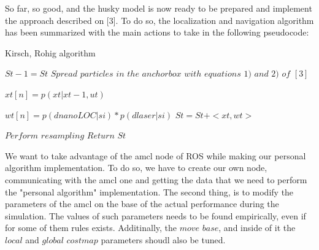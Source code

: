 \documentclass[11pt,a4paper]{article}
\begin{document}
So far, so good, and the husky model is now ready to be prepared and implement the approach described on [3]. To do so, the localization and navigation algorithm has been summarized with the main actions to take in the following pseudocode:

\begin{algorithm}[!h]
   \caption{Kirsch, Rohig algorithm}
    \begin{algorithmic}[1]
    	\State $St-1 = St$
         
            \State $Spread $ $particles$ $in$ $the$ $anchorbox$ $with$ $equations$ $1)$ $and$ $2)$ $of$ $[3]$ 
            
            \State $xt[n] = p(xt|xt-1,ut)$ 
            
        	\State $wt[n] = p(dnanoLOC|si)*p(dlaser|si)$ 
        	\State $St = St + <xt,wt>$ 
        	
        	\State $Perform$ $resampling$
        \EndFor
    \State $Return$ $St$

\end{algorithmic}
\end{algorithm}

We want to take advantage of the amcl node of ROS while making our personal algorithm implementation. To do so, we have to create our own node, communicating with the amcl one and getting the data that we need to perform the "personal algorithm" implementation. The second thing, is to modify the parameters of the amcl on the base of the actual performance during the simulation. The values of such parameters needs to be found empirically, even if for some of them rules exists. Additinally, the $move$ $base$, and inside of it the $local$ and $global$ $costmap$ parameters shoudl also be tuned. 
\end{document}
